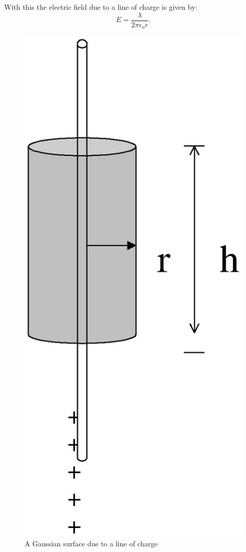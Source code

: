 {\noindent With this the electric field due to a line of charge is
given by:
\begin{equation}
E= \frac{\lambda}{2\pi\epsilon_o r}.\label{line}
\end{equation}

\begin{figure}[!htb]
\centering
\epsfxsize=6cm \includegraphics[scale=0.4]{1_electrostatics/es3.eps}
\caption{A Gaussian
surface due to a line of charge}
 \label{es3}
\end{figure}



}
